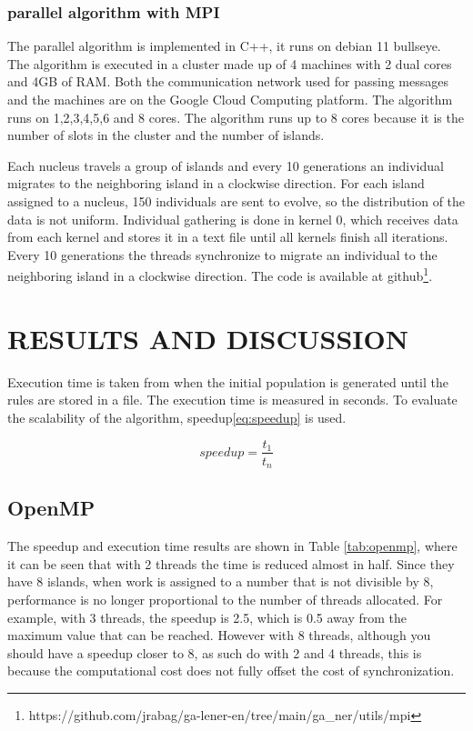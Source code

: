 \documentclass{IEEEtran}
\begin{document}
\subsubsection{parallel algorithm with MPI}

The parallel algorithm is implemented in C++, it runs on debian 11 bullseye. The algorithm is executed in a cluster made up of 4 machines with 2 dual cores and 4GB of RAM. Both the communication network used for passing messages and the machines are on the Google Cloud Computing platform. The algorithm runs on 1,2,3,4,5,6 and 8 cores. The algorithm runs up to 8 cores because it is the number of slots in the cluster and the number of islands.

Each nucleus travels a group of islands and every 10 generations an individual migrates to the neighboring island in a clockwise direction. For each island assigned to a nucleus, 150 individuals are sent to evolve, so the distribution of the data is not uniform. Individual gathering is done in kernel 0, which receives data from each kernel and stores it in a text file until all kernels finish all iterations. Every 10 generations the threads synchronize to migrate an individual to the neighboring island in a clockwise direction. The code is available at github\footnote{https://github.com/jrabag/ga\--lener\--en/tree/main/ga\_ner/utils/mpi}.


\section{RESULTS AND DISCUSSION}


Execution time is taken from when the initial population is generated until the rules are stored in a file. The execution time is measured in seconds. To evaluate the scalability of the algorithm, speedup\ref{eq:speedup} is used.

\begin{equation}
  \label{eq:speedup}
  speedup = \frac{t_{1}}{t_{n}}
\end{equation}


\subsection{OpenMP}

The speedup and execution time results are shown in Table \ref{tab:openmp}, where it can be seen that with 2 threads the time is reduced almost in half. Since they have 8 islands, when work is assigned to a number that is not divisible by 8, performance is no longer proportional to the number of threads allocated. For example, with 3 threads, the speedup is 2.5, which is 0.5 away from the maximum value that can be reached. However with 8 threads, although you should have a speedup closer to 8, as such do with 2 and 4 threads, this is because the computational cost does not fully offset the cost of synchronization.
\end{document}
